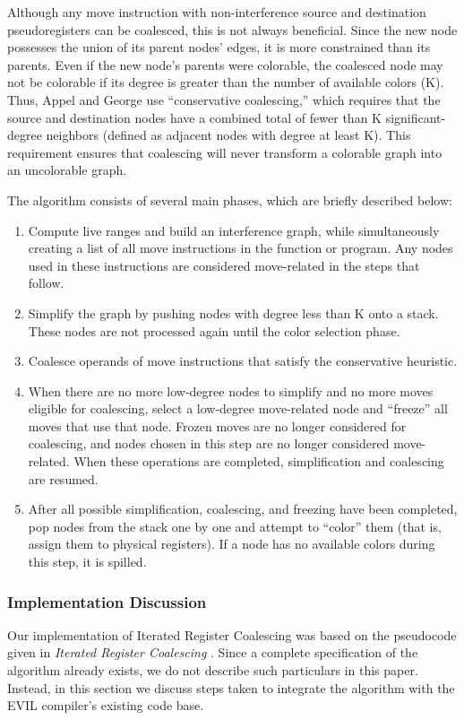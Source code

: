 \documentclass[12pt]{article}
\begin{document}
Although any move instruction with non-interference source and destination pseudoregisters can be coalesced, this is not always beneficial.
Since the new node possesses the union of its parent nodes' edges, it is more constrained than its parents.
Even if the new node's parents were colorable, the coalesced node may not be colorable if its degree is greater than the number of available colors (K).
Thus, Appel and George use “conservative coalescing,” which requires that the source and destination nodes have a combined total of fewer than K significant-degree neighbors (defined as adjacent nodes with degree at least K).
This requirement ensures that coalescing will never transform a colorable graph into an uncolorable graph.

The algorithm consists of several main phases, which are briefly described below:

\begin{enumerate}
\item Compute live ranges and build an interference graph, while simultaneously creating a list of all move instructions in the function or program.
      Any nodes used in these instructions are considered move-related in the steps that follow.
\item Simplify the graph by pushing nodes with degree less than K onto a stack.
      These nodes are not processed again until the color selection phase.
\item Coalesce operands of move instructions that satisfy the conservative heuristic.
\item When there are no more low-degree nodes to simplify and no more moves eligible for coalescing, select a low-degree move-related node and “freeze” all moves that use that node.
      Frozen moves are no longer considered for coalescing, and nodes chosen in this step are no longer considered move-related.
      When these operations are completed, simplification and coalescing are resumed.
\item After all possible simplification, coalescing, and freezing have been completed, pop nodes from the stack one by one and attempt to “color” them (that is, assign them to physical registers).
      If a node has no available colors during this step, it is spilled.
\end{enumerate}

\subsubsection{Implementation Discussion}
Our implementation of Iterated Register Coalescing was based on the pseudocode given in \emph{Iterated Register Coalescing} \cite{iteratedRegisterCoalescing}.
Since a complete specification of the algorithm already exists, we do not describe such particulars in this paper.
Instead, in this section we discuss steps taken to integrate the algorithm with the EVIL compiler's existing code base.
\end{document}
